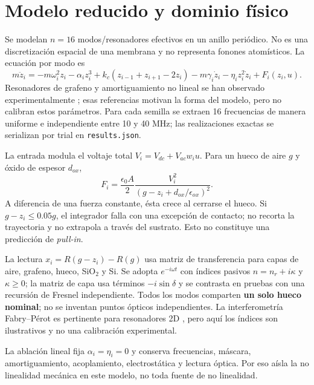 \documentclass[11pt,a4paper]{article}
\begin{document}
\section{Modelo reducido y dominio físico}
Se modelan $n=16$ modos/resonadores efectivos en un anillo periódico. No es una discretización espacial de una membrana y no representa fonones atomísticos. La ecuación por modo es
\begin{equation}
 m\ddot z_i=-m\omega_i^2z_i-\alpha_i z_i^3+k_c(z_{i-1}+z_{i+1}-2z_i)
 -m\gamma_i\dot z_i-\eta_i z_i^2\dot z_i+F_i(z_i,u).
\end{equation}
Resonadores de grafeno y amortiguamiento no lineal se han observado experimentalmente \cite{bunch2007,eichler2011}; esas referencias motivan la forma del modelo, pero no calibran estos parámetros. Para cada semilla se extraen 16 frecuencias de manera uniforme e independiente entre 10 y 40 MHz; las realizaciones exactas se serializan por trial en \texttt{results.json}.

La entrada modula el voltaje total $V_i=V_{dc}+V_{ac}w_i u$. Para un hueco de aire $g$ y óxido de espesor $d_{ox}$,
\begin{equation}
 F_i=\frac{\epsilon_0A}{2}\frac{V_i^2}
 {(g-z_i+d_{ox}/\epsilon_{ox})^2}.
\end{equation}
A diferencia de una fuerza constante, ésta crece al cerrarse el hueco. Si $g-z_i\leq0.05g$, el integrador falla con una excepción de contacto; no recorta la trayectoria y no extrapola a través del sustrato. Esto no constituye una predicción de \emph{pull-in}.

La lectura $x_i=R(g-z_i)-R(g)$ usa matriz de transferencia para capas de aire, grafeno, hueco, SiO$_2$ y Si. Se adopta $e^{-i\omega t}$ con índices pasivos $n=n_r+i\kappa$ y $\kappa\geq0$; la matriz de capa usa términos $-i\sin\delta$ y se contrasta en pruebas con una recursión de Fresnel independiente. Todos los modos comparten \textbf{un solo hueco nominal}; no se inventan puntos ópticos independientes. La interferometría Fabry--Pérot es pertinente para resonadores 2D \cite{aguila2022}, pero aquí los índices son ilustrativos y no una calibración experimental.

La ablación lineal fija $\alpha_i=\eta_i=0$ y conserva frecuencias, máscara, amortiguamiento, acoplamiento, electrostática y lectura óptica. Por eso aísla la no linealidad mecánica en este modelo, no toda fuente de no linealidad.
\end{document}
